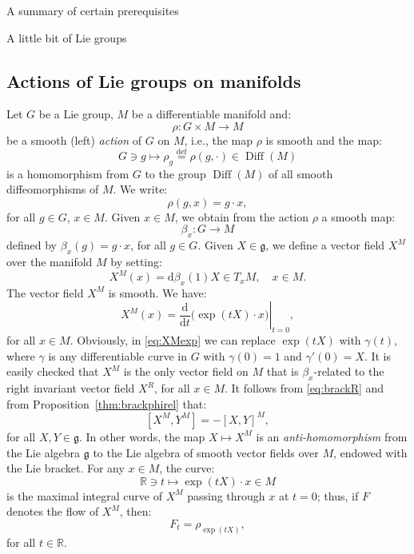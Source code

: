 \documentclass[oneside,a4paper,11pt]{amsbook}
\newcommand{\R}{\mathds R}
\newcommand{\dd}{\mathrm d}
\DeclareMathOperator{\Diff}{Diff}
\theoremstyle{remark}\newtheorem{exercise}{Exercise}[chapter]
\theoremstyle{plain}\newtheorem{teo}{Theorem}[section]
\theoremstyle{plain}\newtheorem{lem}[teo]{Lemma}
\theoremstyle{plain}\newtheorem{prop}[teo]{Proposition}
\theoremstyle{plain}\newtheorem{cor}[teo]{Corollary}
\theoremstyle{definition}\newtheorem{defin}[teo]{Definition}
\theoremstyle{remark}\newtheorem{rem}[teo]{Remark}
\theoremstyle{definition}\newtheorem{notation}[teo]{Notation}
\theoremstyle{definition}\newtheorem{convention}[teo]{Convention}
\theoremstyle{definition}\newtheorem{example}[teo]{Example}
\numberwithin{section}{chapter}
\numberwithin{equation}{section}
\begin{document}
\begin{chapter}{A summary of certain prerequisites}
\begin{section}{A little bit of Lie groups}
\subsection{Actions of Lie groups on manifolds}\label{sub:Lieactions}

Let $G$ be a Lie group, $M$ be a differentiable manifold and:
\[\rho:G\times M\longrightarrow M\]
be a smooth (left) {\em action\/} of $G$ on $M$, i.e., the map $\rho$ is smooth and the map:
\[G\ni g\longmapsto\rho_g\stackrel{\text{def}}=\rho(g,\cdot)\in\Diff(M)\]
is a homomorphism from $G$ to the group $\Diff(M)$ of all smooth diffeomorphisms of $M$. We write:
\[\rho(g,x)=g\cdot x,\]
for all $g\in G$, $x\in M$. Given $x\in M$, we obtain from the action $\rho$ a smooth map:
\[\beta_x:G\longrightarrow M\]
defined by $\beta_x(g)=g\cdot x$, for all $g\in G$. Given $X\in\mathfrak g$, we define a vector field $X^{\!M}$ over the manifold $M$ by setting:
\begin{equation}\label{eq:defXM}
X^{\!M}(x)=\dd\beta_x(1)X\in T_xM,\quad x\in M.
\end{equation}
The vector field $X^{\!M}$ is smooth. We have:
\begin{equation}\label{eq:XMexp}
X^{\!M}(x)=\left.\frac{\dd}{\dd t}\big(\!\exp(tX)\cdot x\big)\right\vert_{t=0},
\end{equation}
for all $x\in M$. Obviously, in \eqref{eq:XMexp} we can replace $\exp(tX)$ with $\gamma(t)$, where $\gamma$ is any differentiable curve in $G$
with $\gamma(0)=1$ and $\gamma'(0)=X$. It is easily checked that $X^{\!M}$ is the only vector field on $M$ that is $\beta_x$-related to the right invariant
vector field $X^R$, for all $x\in M$. It follows from \eqref{eq:brackR} and from Proposition~\ref{thm:brackphirel} that:
\begin{equation}\label{eq:brackXYM}
[X^{\!M},Y^{\!M}]=-[X,Y]^{\!M},
\end{equation}
for all $X,Y\in\mathfrak g$. In other words, the map $X\mapsto X^{\!M}$ is an {\em anti-homomor\-phism\/} from the Lie algebra $\mathfrak g$ to
the Lie algebra of smooth vector fields over $M$, endowed with the Lie bracket. For any $x\in M$, the curve:
\[\R\ni t\longmapsto\exp(tX)\cdot x\in M\]
is the maximal integral curve of $X^{\!M}$ passing through $x$ at $t=0$; thus, if $F$ denotes the flow of $X^{\!M}$, then:
\[F_t=\rho_{\exp(tX)},\]
for all $t\in\R$.


\end{section}
\end{chapter}
\end{document}
